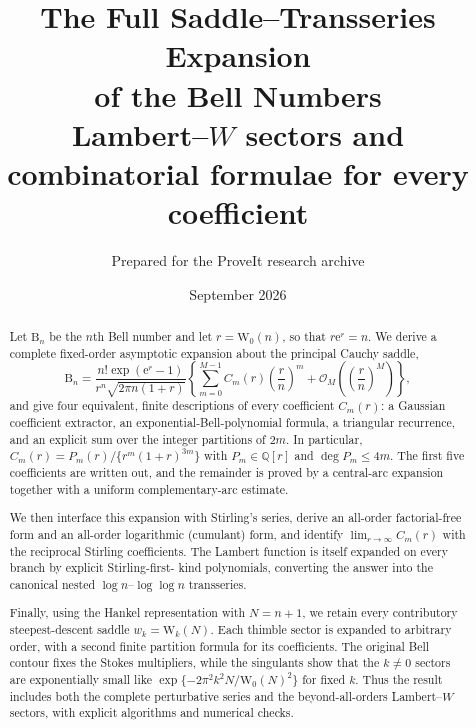 \documentclass[11pt,a4paper]{article}
\title{\vspace{-1.0cm}\textbf{The Full Saddle--Transseries Expansion\\of the Bell Numbers}\\[0.45em]
\large Lambert--$W$ sectors and combinatorial formulae for every coefficient}
\author{Prepared for the ProveIt research archive}
\date{September 2026}
\theoremstyle{definition}
\newcommand{\Bell}{\mathrm B}
\newcommand{\W}{\mathrm W}
\newcommand{\ee}{\mathrm e}
\newcommand{\bigO}{\mathcal O}
\begin{document}
\maketitle

\begin{abstract}
Let $\Bell_n$ be the $n$th Bell number and let $r=\W_0(n)$, so that
$r\ee^r=n$.  We derive a complete fixed-order asymptotic expansion about the
principal Cauchy saddle,
\[
 \Bell_n=
 \frac{n!\exp(\ee^r-1)}{r^n\sqrt{2\pi n(1+r)}}
 \left\{\sum_{m=0}^{M-1}C_m(r)\left(\frac rn\right)^m
 +\bigO_M\!\left(\left(\frac rn\right)^M\right)\right\},
\]
and give four equivalent, finite descriptions of every coefficient $C_m(r)$:
a Gaussian coefficient extractor, an exponential-Bell-polynomial formula, a
triangular recurrence, and an explicit sum over the integer partitions of
$2m$.  In particular,
$C_m(r)=P_m(r)/\{r^m(1+r)^{3m}\}$ with
$P_m\in\mathbb Q[r]$ and $\deg P_m\le 4m$.  The first five coefficients are
written out, and the remainder is proved by a central-arc expansion together
with a uniform complementary-arc estimate.

We then interface this expansion with Stirling's series, derive an all-order
factorial-free form and an all-order logarithmic (cumulant) form, and identify
$\lim_{r\to\infty}C_m(r)$ with the reciprocal Stirling coefficients.  The
Lambert function is itself expanded on every branch by explicit Stirling-first-
kind polynomials, converting the answer into the canonical nested
$\log n$--$\log\log n$ transseries.

Finally, using the Hankel representation with $N=n+1$, we retain every
contributory steepest-descent saddle $w_k=\W_k(N)$.  Each thimble sector is
expanded to arbitrary order, with a second finite partition formula for its
coefficients.  The original Bell contour fixes the Stokes multipliers, while
the singulants show that the $k\ne0$ sectors are exponentially small like
$\exp\{-2\pi^2k^2N/\W_0(N)^2\}$ for fixed $k$.  Thus the result includes both
the complete perturbative series and the beyond-all-orders Lambert--$W$
sectors, with explicit algorithms and numerical checks.
\end{abstract}
\end{document}
